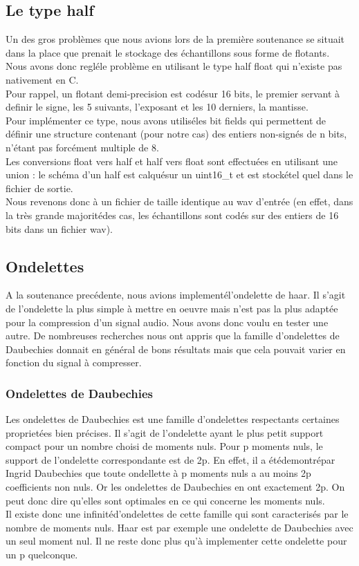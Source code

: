 \documentclass[a4paper,12pt]{article}
\begin{document}
	\subsection{Le type half}
Un des gros probl\`emes que nous avions lors de la premi\`ere soutenance se situait
dans la place que prenait le stockage des \'echantillons sous forme de flotants.\\
Nous avons donc regl\'ele probl\`eme en utilisant le type half float qui n'existe
pas nativement en C.\\
Pour rappel, un flotant demi-precision est cod\'esur 16 bits, le premier servant
à definir le signe, les 5 suivants, l'exposant et les 10 derniers, la
mantisse.\\
Pour impl\'ementer ce type, nous avons utilis\'eles bit fields qui permettent de
d\'efinir une structure contenant (pour notre cas) des entiers non-sign\'es de n
bits, n'\'etant pas forc\'ement multiple de 8.\\
Les conversions float vers half et half vers float sont effectu\'ees en utilisant
une union : le sch\'ema d'un half est calqu\'esur un uint16\_t et est stock\'etel
quel dans le fichier de sortie.\\
Nous revenons donc à un fichier de taille identique au wav d'entr\'ee (en effet,
dans la tr\`es grande majorit\'edes cas, les \'echantillons sont cod\'es sur des
entiers de 16 bits dans un fichier wav).
	\subsection{Ondelettes}
A la soutenance prec\'edente, nous avions implement\'el'ondelette de
haar. Il s'agit de l'ondelette la plus simple à mettre en oeuvre mais
n'est pas la plus adapt\'ee pour la compression d'un signal audio.
Nous avons donc voulu en tester une autre. De nombreuses recherches
nous ont appris que la famille d'ondelettes de Daubechies donnait en
g\'en\'eral de bons r\'esultats mais que cela pouvait varier en fonction du
signal à compresser.\\
\subsubsection{Ondelettes de Daubechies}
Les ondelettes de Daubechies est une famille d'ondelettes respectants
certaines propriet\'ees bien pr\'ecises. Il s'agit de l'ondelette ayant le
plus petit support compact pour un nombre choisi de moments nuls. Pour
p moments nuls, le support de l'ondelette correspondante est de 2p. En
effet, il a \'et\'edemontr\'epar Ingrid Daubechies que toute ondellette à
p moments nuls a au moins 2p coefficients non nuls. Or les ondelettes
de Daubechies en ont exactement 2p. On peut donc dire qu'elles sont
optimales en ce qui concerne les moments nuls.\\
Il existe donc une infinit\'ed'ondelettes de cette famille qui sont
caracteris\'es par le nombre de moments nuls. Haar est par exemple une
ondelette de Daubechies avec un seul moment nul. Il ne reste donc plus
qu'à implementer cette ondelette pour un p quelconque.
\end{document}
